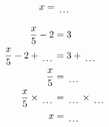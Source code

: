 \documentclass[12pt]{article}
\newcounter{minipagecount}
\begin{document}
\begin{multicols}{2}
\begin{minipage}[t]{0.45\textwidth}
\begin{align*}
        x &= \dotuline{\hspace{5mm}}\\
    \end{align*}
\end{minipage} %
\noindent{(\theminipagecount)}\hspace{0.1mm} %
\begin{minipage}[t]{0.45\textwidth} %
    \vspace{-26pt}  %
    \raggedright %
    \begin{align*} %
        \frac{x}{5} - 2 &= 3\\
        \frac{x}{5} - 2 + \dotuline{\hspace{5mm}} &= 3 + \dotuline{\hspace{5mm}}\\
        \frac{x}{5} &= \dotuline{\hspace{5mm}}\\
        \frac{x}{5} \times\dotuline{\hspace{5mm}} &= \dotuline{\hspace{5mm}} \times\dotuline{\hspace{5mm}}\\
        x &= \dotuline{\hspace{5mm}}\\
    \end{align*}
\end{minipage} %
\noindent{(\theminipagecount)}\hspace{0.1mm} %
\begin{minipage}[t]{0.45\textwidth} %
    \vspace{-26pt}  %

\end{minipage}
\end{multicols}
\end{document}
